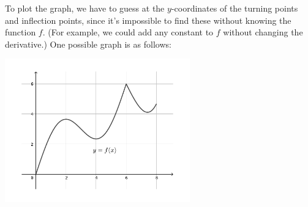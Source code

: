 \documentclass[12pt]{article}
\begin{document}
\begin{enumerate}
To plot the graph, we have to guess at the $y$-coordinates of the turning points and inflection points, since it's impossible to find these without knowing the function $f$. (For example, we could add any constant to $f$ without changing the derivative.) One possible graph is as follows:
\begin{center}
\includegraphics[width=0.6\textwidth]{Tut6-4sol}
\end{center}
  \end{enumerate}
  \newpage
  
\end{document}
